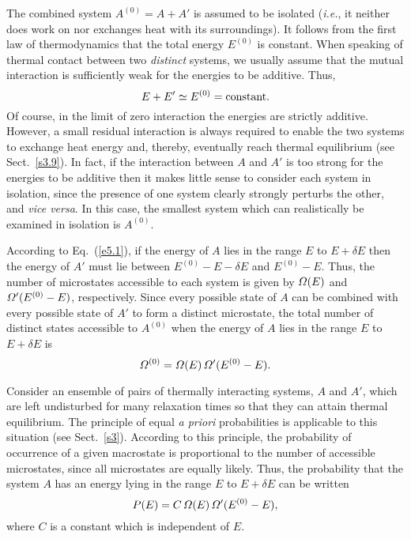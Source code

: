 The combined system $A^{(0)} = A + A'$ is assumed to be
isolated ({\em i.e.}, it neither does work on
nor exchanges heat with its surroundings). It follows from the first law of 
thermodynamics that the total energy $E^{(0)}$ is constant. 
When
speaking of thermal contact between two {\em distinct}\/
systems, we usually assume that the mutual interaction is
sufficiently weak for  the energies to be additive. Thus, 
\begin{equation}
E + E' \simeq E^{(0)} = {\rm constant}.\label{e5.1}
\end{equation}
Of course, in the limit of zero
 interaction the energies are strictly additive. However,
a small residual interaction is always required to enable the two systems to exchange
heat energy and, thereby, eventually
reach thermal equilibrium (see Sect.~\ref{s3.9}). In fact, if
 the interaction between $A$ and $A'$ is too strong for the energies to be
additive then it makes little
sense to consider each system in isolation, since the presence of one system clearly
strongly perturbs the other, and {\em vice versa}. In  this case, the smallest system
which can realistically be examined in isolation is $A^{(0)}$.


According to Eq.~(\ref{e5.1}), if the energy of $A$ lies in the range $E$ to $E+\delta E$ 
then the energy of $A'$ must lie between $E^{(0)}- E -\delta E$ and $E^{(0)}- E$.
Thus, the number of microstates accessible to each system is
given by ${\mit\Omega}(E)$ and ${\mit\Omega}'(E^{(0)}-E)$, respectively.
 Since every possible state of $A$ can be 
combined with every possible state of $A'$ to form a distinct microstate, 
the total number of distinct states 
accessible to $A^{(0)}$ when the energy of $A$ lies in the range $E$ to $E+\delta E$
is 
\begin{equation}
{\mit\Omega}^{(0)} = {\mit\Omega}(E)\, {\mit\Omega}'(E^{(0)} - E).\label{e5.2}
\end{equation}

Consider an ensemble of pairs of thermally interacting systems, 
$A$ and $A'$, which are left undisturbed
for many relaxation times so that they can  attain thermal equilibrium.
The principle of equal {\em a priori} probabilities is applicable to
this situation (see Sect.~\ref{s3}). 
According to this principle, the probability of occurrence of a given macrostate
is proportional to the number of accessible microstates, since all microstates are
equally likely. Thus, the probability that the system $A$ has an energy lying in
the range $E$ to $E+\delta E$ can be written
\begin{equation}
P(E) = C\, {\mit\Omega}(E) \,{\mit\Omega}'(E^{(0)} - E),\label{e5.3}
\end{equation}
where $C$ is a constant which is independent of $E$. 

